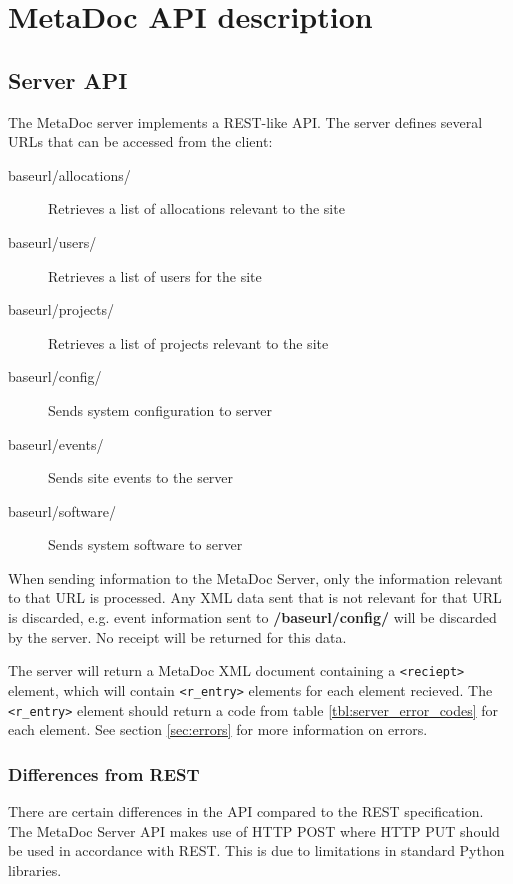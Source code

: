 \documentclass[titlepage, a4paper,10pt]{article}
\begin{document}
\newpage
\section{MetaDoc API description}

\subsection{Server API}

The MetaDoc server implements a REST-like API. The server defines several URLs 
that can be accessed from the client:

\begin{description}
    \item[baseurl/allocations/] Retrieves a list of allocations relevant to the 
        site
    \item[baseurl/users/] Retrieves a list of users for the site
    \item[baseurl/projects/] Retrieves a list of projects relevant to the site
    \item[baseurl/config/] Sends system configuration to server
    \item[baseurl/events/] Sends site events to the server
    \item[baseurl/software/] Sends system software to server
\end{description}

When sending information to the MetaDoc Server, only the information relevant to 
that URL is processed. Any XML data sent that is not relevant for that URL is 
discarded, e.g. event information sent to \textbf{/baseurl/config/} will be 
discarded by the server. No receipt will be returned for this data.  

The server will return a MetaDoc XML document containing a \texttt{<reciept>} 
element, which will contain \texttt{<r\_entry>} elements for each element 
recieved. The \texttt{<r\_entry>} element should return a code from table 
\ref{tbl:server_error_codes} for each element. See section \ref{sec:errors} for 
more information on errors. 

\subsubsection{Differences from REST}

There are certain differences in the API compared to the REST specification. The 
MetaDoc Server API makes use of HTTP POST where HTTP PUT should be used in 
accordance with REST. This is due to limitations in standard Python libraries.
\end{document}
